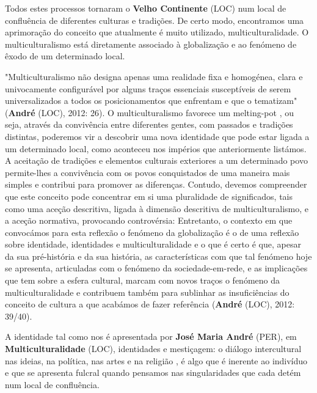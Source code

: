 \documentclass[12pt,a4paper]{article}
\begin{document}
Todos estes processos tornaram o \textbf{Velho Continente} (LOC) num local de confluência de diferentes culturas e tradições. De certo modo, encontramos uma aprimoração do conceito que  atualmente  é  muito  utilizado,  multiculturalidade.  O  multiculturalismo  está diretamente associado à globalização e ao fenómeno de êxodo de um determinado local.

"Multiculturalismo  não  designa  apenas  uma  realidade  fixa  e  homogénea,  clara  e univocamente  configurável  por  alguns  traços  essenciais  susceptíveis  de  serem universalizados a todos os posicionamentos que enfrentam e que o tematizam" (\textbf{André} (LOC), 2012: 26). O multiculturalismo favorece um melting-pot , ou seja, através da convivência entre diferentes gentes, com passados e tradições distintas, poderemos vir a descobrir uma nova  identidade  que  pode  estar  ligada  a  um  determinado  local,  como  aconteceu  nos impérios  que  anteriormente  listámos.  A  aceitação  de  tradições  e  elementos  culturais exteriores a um determinado povo permite-lhes a convivência com os povos conquistados de uma maneira mais simples e contribui para promover as diferenças. Contudo, devemos compreender que este conceito pode concentrar em si uma pluralidade de significados, tais como uma aceção descritiva, ligada à dimensão descritiva de multiculturalismo, e a aceção normativa, provocando controvérsia: Entretanto, o contexto em que convocámos para esta reflexão o fenómeno da globalização é o de uma reflexão sobre identidade, identidades e multiculturalidade e o que é certo é que, apesar da sua pré-história e da sua história, as características com que tal fenómeno hoje se apresenta, articuladas com o fenómeno da sociedade-em-rede, e as implicações que  tem  sobre  a  esfera  cultural,  marcam  com  novos  traços  o  fenómeno  da multiculturalidade e contribuem também para sublinhar as insuficiências do conceito de cultura a que acabámos de fazer referência (\textbf{André} (LOC), 2012: 39/40).

A  identidade  tal  como  nos  é  apresentada  por  \textbf{José  Maria  André} (PER),  em \textbf{Multiculturalidade} (LOC),  identidades  e  mestiçagem:  o  diálogo  intercultural  nas  ideias,  na política, nas artes e na religião , é algo que é inerente ao indivíduo e que  se apresenta fulcral quando pensamos nas singularidades que cada detém num local de confluência.
\end{document}
